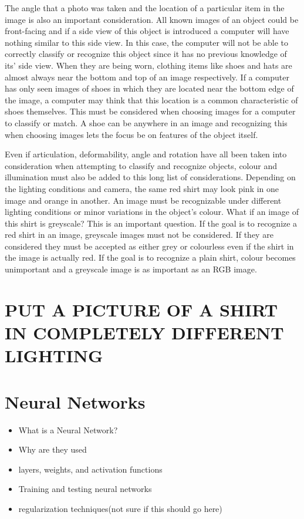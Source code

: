 \documentclass[12pt]{article} %
\begin{document}
	The angle that a photo was taken and the location of a particular item in the image is also an important consideration. All known images of an object could be front-facing and if a side view of this object is introduced a computer will have nothing similar to this side view. In this case, the computer will not be able to correctly classify or recognize this object since it has no previous knowledge of its' side view. When they are being worn, clothing items like shoes and hats are almost always near the bottom and top of an image respectively. If a computer has only seen images of shoes in which they are located near the bottom edge of the image, a computer may think that this location is a common characteristic of shoes themselves. This must be considered when choosing images for a computer to classify or match. A shoe can be anywhere in an image and recognizing this when choosing images lets the focus be on features of the object itself. 
	
	Even if articulation, deformability, angle and rotation have all been taken into consideration when attempting to classify and recognize objects, colour and illumination must also be added to this long list of considerations. Depending on the lighting conditions and camera, the same red shirt may look pink in one image and orange in another. An image must be recognizable under different lighting conditions or minor variations in the object's colour. What if an image of this shirt is greyscale? This is an important question. If the goal is to recognize a red shirt in an image, greyscale images must not be considered. If they are considered they must be accepted as either grey or colourless even if the shirt in the image is actually red. If the goal is to recognize a plain shirt, colour becomes unimportant and a greyscale image is as important as an RGB image. 
 \section{PUT A PICTURE OF A SHIRT IN COMPLETELY DIFFERENT LIGHTING}


\section{Neural Networks}
\begin{itemize}
\item What is a Neural Network?
\item Why are they used
\item layers, weights, and activation functions
\item Training and testing neural networks 
\item regularization techniques(not sure if this should go here)
\end{itemize}
\end{document}
